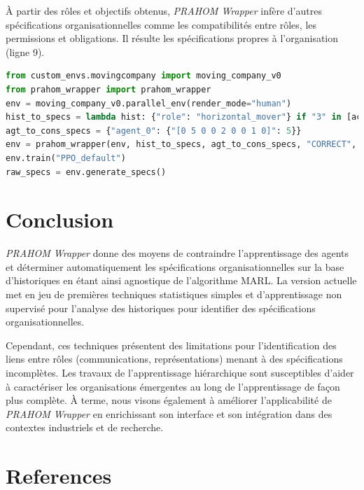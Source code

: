 \documentclass[demonstration]{jfsma}
\begin{document}
À partir des rôles et objectifs obtenus, \emph{PRAHOM Wrapper} infère d'autres spécifications organisationnelles comme les compatibilités entre rôles, les permissions et obligations. Il résulte les spécifications propres à l'organisation (ligne 9).

\begin{lstlisting}[language=Python, caption={Utilisation synthétique de \emph{PRAHOM Wrapper} pour \emph{Moving Company}}, label={lst:wrapper_mc}]
from custom_envs.movingcompany import moving_company_v0
from prahom_wrapper import prahom_wrapper
env = moving_company_v0.parallel_env(render_mode="human")
hist_to_specs = lambda hist: {"role": "horizontal_mover"} if "3" in [act for obs, act in hist.items()] else None
agt_to_cons_specs = {"agent_0": {"[0 5 0 0 2 0 0 1 0]": 5}}
env = prahom_wrapper(env, hist_to_specs, agt_to_cons_specs, "CORRECT", ["sequence_clustering"], ["role", "goals"], ["dendogram", "PCA"])
env.train("PPO_default")
raw_specs = env.generate_specs()
\end{lstlisting}

\section{Conclusion}

\emph{PRAHOM Wrapper} donne des moyens de contraindre l'apprentissage des agents et déterminer automatiquement les spécifications organisationnelles sur la base d'historiques en étant ainsi agnostique de l'algorithme MARL.
La version actuelle met en jeu de premières techniques statistiques simples et d'apprentissage non supervisé pour l'analyse des historiques pour identifier des spécifications organisationnelles.

Cependant, ces techniques présentent des limitations pour l'identification des liens entre rôles (communications, représentations) menant à des spécifications incomplètes.
Les travaux de l'apprentissage hiérarchique sont susceptibles d'aider à caractériser les organisations émergentes au long de l’apprentissage de façon plus complète.
À terme, nous visons également à améliorer l'applicabilité de \emph{PRAHOM Wrapper} en enrichissant son interface et son intégration dans des contextes industriels et de recherche.






\section*{References}
\small


\end{document}
